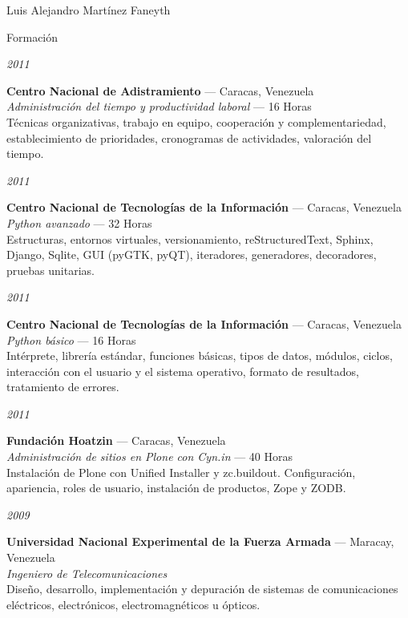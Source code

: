 \documentclass[10pt,letterpaper]{article}
\begin{document}
\begin{cv}{Luis Alejandro Mart\'inez Faneyth}
\begin{cvlist}{Formaci\'on}
\item[{\parbox[t]{6em}{\textit{\large{2011}}}}]{
	\parbox[t]{\linewidth}{
		\textbf{Centro Nacional de Adistramiento} --- Caracas, Venezuela\\
		\textit{Administraci\'on del tiempo y productividad laboral} --- 16 Horas\\
		\footnotesize{T\'ecnicas organizativas, trabajo en equipo, cooperaci\'on y complementariedad, establecimiento de prioridades, cronogramas de actividades, valoraci\'on del tiempo.}
	}
}
\item[{\parbox[t]{6em}{\textit{\large{2011}}}}]{
	\parbox[t]{\linewidth}{
		\textbf{Centro Nacional de Tecnolog\'ias de la Informaci\'on} --- Caracas, Venezuela\\
		\textit{Python avanzado} --- 32 Horas\\
		\footnotesize{Estructuras, entornos virtuales, versionamiento, reStructuredText, Sphinx, Django, Sqlite, GUI (pyGTK, pyQT), iteradores, generadores, decoradores, pruebas unitarias.}
	}
}
\item[{\parbox[t]{6em}{\textit{\large{2011}}}}]{
	\parbox[t]{\linewidth}{
		\textbf{Centro Nacional de Tecnolog\'ias de la Informaci\'on} --- Caracas, Venezuela\\
		\textit{Python b\'asico} --- 16 Horas\\
		\footnotesize{Int\'erprete, librer\'ia est\'andar, funciones b\'asicas, tipos de datos, m\'odulos, ciclos, interacci\'on con el usuario y el sistema operativo, formato de resultados, tratamiento de errores.}
	}
}
\item[{\parbox[t]{6em}{\textit{\large{2011}}}}]{
	\parbox[t]{\linewidth}{
		\textbf{Fundaci\'on Hoatzin} --- Caracas, Venezuela\\
		\textit{Administraci\'on de sitios en Plone con Cyn.in} --- 40 Horas\\
		\footnotesize{Instalaci\'on de Plone con Unified Installer y zc.buildout. Configuraci\'on, apariencia, roles de usuario, instalaci\'on de productos, Zope y ZODB.}
	}
}
\item[{\parbox[t]{6em}{\textit{\large{2009}}}}]{
	\parbox[t]{\linewidth}{
		\textbf{Universidad Nacional Experimental de la Fuerza Armada} --- Maracay, Venezuela\\
		\textit{Ingeniero de Telecomunicaciones}\\
		\footnotesize{Dise\~no, desarrollo, implementaci\'on y depuraci\'on de sistemas de comunicaciones el\'ectricos, electr\'onicos, electromagn\'eticos u \'opticos.}
	}
}
\end{cvlist}


\end{cv}
\end{document}
